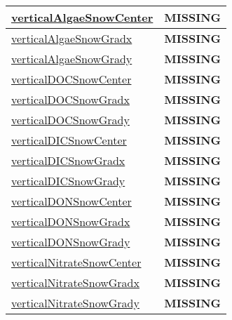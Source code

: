 {\begin{center}
\begin{longtable}{| p{2.0in} | p{4.0in} |}
    \hline
    \hyperref[subsec:var_sec_tracer_reconstruction_verticalAlgaeSnowCenter]{verticalAlgaeSnowCenter} & {\bf \color{red} MISSING} \\
    \hline
    \hyperref[subsec:var_sec_tracer_reconstruction_verticalAlgaeSnowGradx]{verticalAlgaeSnowGradx} & {\bf \color{red} MISSING} \\
    \hline
    \hyperref[subsec:var_sec_tracer_reconstruction_verticalAlgaeSnowGrady]{verticalAlgaeSnowGrady} & {\bf \color{red} MISSING} \\
    \hline
    \hyperref[subsec:var_sec_tracer_reconstruction_verticalDOCSnowCenter]{verticalDOCSnowCenter} & {\bf \color{red} MISSING} \\
    \hline
    \hyperref[subsec:var_sec_tracer_reconstruction_verticalDOCSnowGradx]{verticalDOCSnowGradx} & {\bf \color{red} MISSING} \\
    \hline
    \hyperref[subsec:var_sec_tracer_reconstruction_verticalDOCSnowGrady]{verticalDOCSnowGrady} & {\bf \color{red} MISSING} \\
    \hline
    \hyperref[subsec:var_sec_tracer_reconstruction_verticalDICSnowCenter]{verticalDICSnowCenter} & {\bf \color{red} MISSING} \\
    \hline
    \hyperref[subsec:var_sec_tracer_reconstruction_verticalDICSnowGradx]{verticalDICSnowGradx} & {\bf \color{red} MISSING} \\
    \hline
    \hyperref[subsec:var_sec_tracer_reconstruction_verticalDICSnowGrady]{verticalDICSnowGrady} & {\bf \color{red} MISSING} \\
    \hline
    \hyperref[subsec:var_sec_tracer_reconstruction_verticalDONSnowCenter]{verticalDONSnowCenter} & {\bf \color{red} MISSING} \\
    \hline
    \hyperref[subsec:var_sec_tracer_reconstruction_verticalDONSnowGradx]{verticalDONSnowGradx} & {\bf \color{red} MISSING} \\
    \hline
    \hyperref[subsec:var_sec_tracer_reconstruction_verticalDONSnowGrady]{verticalDONSnowGrady} & {\bf \color{red} MISSING} \\
    \hline
    \hyperref[subsec:var_sec_tracer_reconstruction_verticalNitrateSnowCenter]{verticalNitrateSnowCenter} & {\bf \color{red} MISSING} \\
    \hline
    \hyperref[subsec:var_sec_tracer_reconstruction_verticalNitrateSnowGradx]{verticalNitrateSnowGradx} & {\bf \color{red} MISSING} \\
    \hline
    \hyperref[subsec:var_sec_tracer_reconstruction_verticalNitrateSnowGrady]{verticalNitrateSnowGrady} & {\bf \color{red} MISSING} \\

\end{longtable}
\end{center}}
